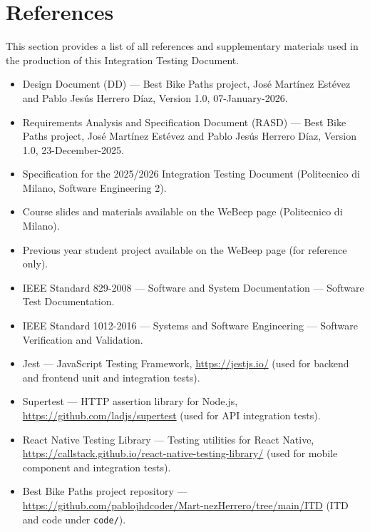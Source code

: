 \section{References}
\label{sec:references}%

This section provides a list of all references and supplementary materials used in the production of this Integration Testing Document.

\begin{itemize}
    \item Design Document (DD) --- Best Bike Paths project, José Martínez Estévez and Pablo Jesús Herrero Díaz, Version 1.0, 07-January-2026.
    \item Requirements Analysis and Specification Document (RASD) --- Best Bike Paths project, José Martínez Estévez and Pablo Jesús Herrero Díaz, Version 1.0, 23-December-2025.
    \item Specification for the 2025/2026 Integration Testing Document (Politecnico di Milano, Software Engineering 2).
    \item Course slides and materials available on the WeBeep page (Politecnico di Milano).
    \item Previous year student project available on the WeBeep page (for reference only).
    \item IEEE Standard 829-2008 --- Software and System Documentation --- Software Test Documentation.
    \item IEEE Standard 1012-2016 --- Systems and Software Engineering --- Software Verification and Validation.
    \item Jest --- JavaScript Testing Framework, \url{https://jestjs.io/} (used for backend and frontend unit and integration tests).
    \item Supertest --- HTTP assertion library for Node.js, \url{https://github.com/ladjs/supertest} (used for API integration tests).
    \item React Native Testing Library --- Testing utilities for React Native, \url{https://callstack.github.io/react-native-testing-library/} (used for mobile component and integration tests).
    \item Best Bike Paths project repository --- \url{https://github.com/pablojhdcoder/Mart-nezHerrero/tree/main/ITD} (ITD and code under \texttt{code/}).
\end{itemize}

